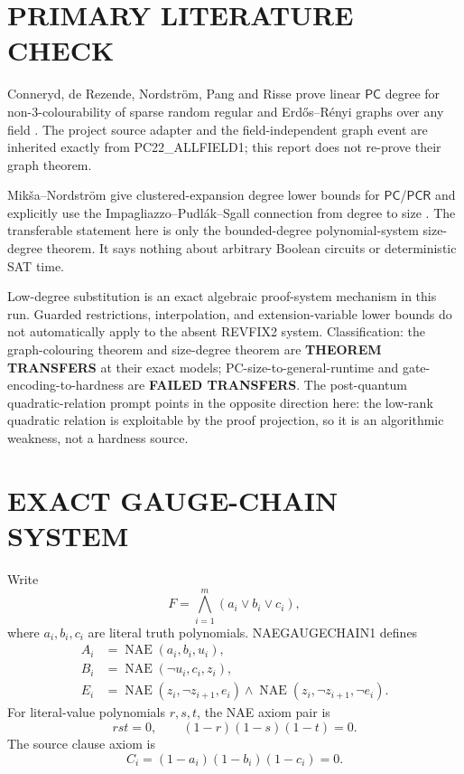 \documentclass[11pt]{article}
\newcommand{\PC}{\ensuremath{\mathsf{PC}}}
\newcommand{\PCR}{\ensuremath{\mathsf{PCR}}}
\begin{document}
\section{PRIMARY LITERATURE CHECK}
Conneryd, de Rezende, Nordstr\"om, Pang and Risse prove linear \PC{} degree
for non-3-colourability of sparse random regular and Erd\H{o}s--R\'enyi
graphs over any field \cite{Conneryd}.  The project source adapter and the
field-independent graph event are inherited exactly from PC22\_ALLFIELD1;
this report does not re-prove their graph theorem.

Mik\v{s}a--Nordstr\"om give clustered-expansion degree lower bounds for
\PC/\PCR{} and explicitly use the Impagliazzo--Pudl\'ak--Sgall connection from
degree to size \cite{MN,IPS}.  The transferable statement here is only the
bounded-degree polynomial-system size-degree theorem.  It says nothing about
arbitrary Boolean circuits or deterministic SAT time.

Low-degree substitution is an exact algebraic proof-system mechanism in this
run.  Guarded restrictions, interpolation, and extension-variable lower bounds
do not automatically apply to the absent REVFIX2 system.  Classification:
the graph-colouring theorem and size-degree theorem are \textbf{THEOREM
TRANSFERS} at their exact models; PC-size-to-general-runtime and
gate-encoding-to-hardness are \textbf{FAILED TRANSFERS}.  The post-quantum
quadratic-relation prompt points in the opposite direction here: the low-rank
quadratic relation is exploitable by the proof projection, so it is an
algorithmic weakness, not a hardness source.

\section{EXACT GAUGE-CHAIN SYSTEM}
Write
\[
F=\bigwedge_{i=1}^m(a_i\vee b_i\vee c_i),
\]
where $a_i,b_i,c_i$ are literal truth polynomials.  NAEGAUGECHAIN1 defines
\begin{align*}
A_i&=\operatorname{NAE}(a_i,b_i,u_i),\\
B_i&=\operatorname{NAE}(\neg u_i,c_i,z_i),\\
E_i&=\operatorname{NAE}(z_i,\neg z_{i+1},e_i)\wedge
\operatorname{NAE}(z_i,\neg z_{i+1},\neg e_i).
\end{align*}
For literal-value polynomials $r,s,t$, the NAE axiom pair is
\[
rst=0,\qquad (1-r)(1-s)(1-t)=0.                 \tag{1}
\]
The source clause axiom is
\[
C_i=(1-a_i)(1-b_i)(1-c_i)=0.                    \tag{2}
\]
\end{document}
